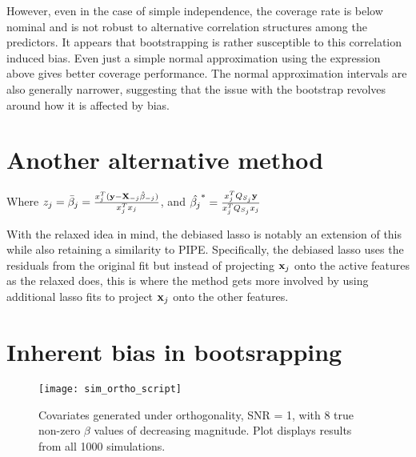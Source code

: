 However, even in the case of simple independence, the coverage rate is below nominal and is not robust to alternative correlation structures among the predictors. It appears that bootstrapping is rather susceptible to this correlation induced bias. Even just a simple normal approximation using the expression above gives better coverage performance. The normal approximation intervals are also generally narrower, suggesting that the issue with the bootstrap revolves around how it is affected by bias.

\newpage

\section{Another alternative method}


Where $z_j = \bar{\beta}_j = \frac{x_j^T(\mathbf{y} - \mathbf{X}_{-j}\hat{\beta}_{-j})}{x_j^T x_j}$, and $\hat{\beta_j}^* = \frac{x_j^T Q_{S_j} \mathbf{y}}{x_j^T Q_{S_j} x_j}$

With the relaxed idea in mind, the debiased lasso is notably an extension of this while also retaining a similarity to PIPE. Specifically, the debiased lasso uses the residuals from the original fit but instead of projecting $\mathbf{x}_j$ onto the active features as the relaxed does, this is where the method gets more involved by using additional lasso fits to project $\mathbf{x}_j$ onto the other features.

\newpage

\section{Inherent bias in bootsrapping}

\begin{figure}[hbtp]
    \begin{center}
    \texttt{[image: sim\_ortho\_script]}
    \caption{\label{Fig:sim_ortho} Covariates generated under orthogonality, SNR = 1, with 8 true non-zero $\beta$ values of decreasing magnitude. Plot displays results from all 1000 simulations.}
    \end{center}
\end{figure}

